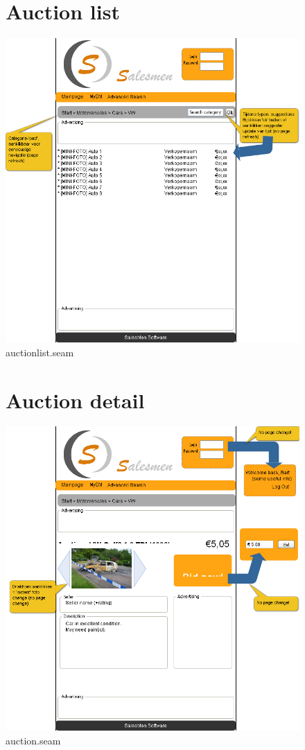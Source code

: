 \documentclass[salesmen, twoside]{../../../templates/latex/2009/softproj}
\begin{document}
\begin{projdoc}
\begin{figure}
\section{Auction list}
\label{fig_prototype_auctionlist}
\includegraphics[width=15cm]{../../img/SM_auction_list.png}
\caption{auctionlist.seam}
\end{figure}
\begin{figure}
\section{Auction detail}
\label{fig_prototype_auctiondetail}
\includegraphics[width=15cm]{../../img/SM_auction_detail.png}
\caption{auction.seam}
\end{figure}
\begin{figure}

\end{figure}
\end{projdoc}
\end{document}
